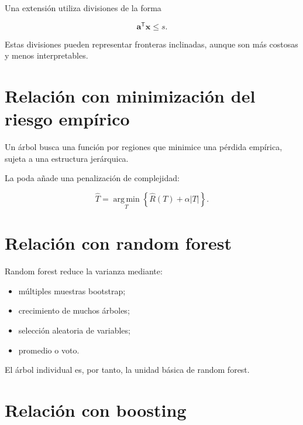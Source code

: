 \documentclass[
  spanish,
  10.5pt,
  letterpaper,
  DIV=11,
  numbers=noendperiod,
  oneside,
  open=any]{scrreprt}
\providecommand{\tightlist}{%
  \setlength{\itemsep}{0pt}\setlength{\parskip}{0pt}}
\theoremstyle{definition}
\theoremstyle{definition}
\theoremstyle{plain}
\theoremstyle{remark}
\begin{document}

Una extensión utiliza divisiones de la forma

\[
\mathbf{a}^{\mathsf T}\mathbf{x}\leq s.
\]

Estas divisiones pueden representar fronteras inclinadas, aunque son más
costosas y menos interpretables.

\section*{Relación con minimización del riesgo
empírico}\label{relaciuxf3n-con-minimizaciuxf3n-del-riesgo-empuxedrico}


Un árbol busca una función por regiones que minimice una pérdida
empírica, sujeta a una estructura jerárquica.

La poda añade una penalización de complejidad:

\[
\widehat{T}
=
\operatorname*{arg\,min}_{T}
\left\{
\widehat{R}(T)+\alpha |T|
\right\}.
\]

\section*{Relación con random
forest}\label{relaciuxf3n-con-random-forest}


Random forest reduce la varianza mediante:

\begin{itemize}
\tightlist
\item
  múltiples muestras bootstrap;
\item
  crecimiento de muchos árboles;
\item
  selección aleatoria de variables;
\item
  promedio o voto.
\end{itemize}

El árbol individual es, por tanto, la unidad básica de random forest.

\section*{Relación con boosting}\label{relaciuxf3n-con-boosting}
\end{document}
